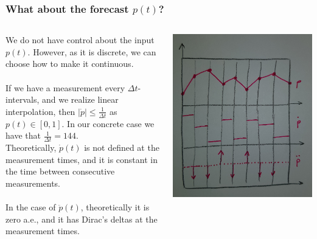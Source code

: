 \documentclass[aspectratio=169]{beamer}\usepackage[utf8]{inputenc}
\begin{document}
\begin{frame}\frametitle{What about the forecast $p(t)$?}

\begin{columns}[c]

We do not have control about the input $p(t)$. However, as it is discrete, we can choose how to make it continuous.\\
\quad\\
If we have a measurement every $\Delta t$-intervals, and we realize linear interpolation, then $|\dot{p}|\leq\frac{1}{\Delta t}$ as $p(t)\in[0,1]$. In our concrete case we have that $\frac{1}{\Delta t}=144$.\\
Theoretically, $\dot{p}(t)$ is not defined at the measurement times, and it is constant in the time between consecutive measurements.\\
\quad\\
In the case of $\ddot{p}(t)$, theoretically it is zero a.e., and it has Dirac's deltas at the measurement times.

\includegraphics[width=0.9\columnwidth]{20200224_180726.jpg}

\end{columns}

\end{frame}
\end{document}
